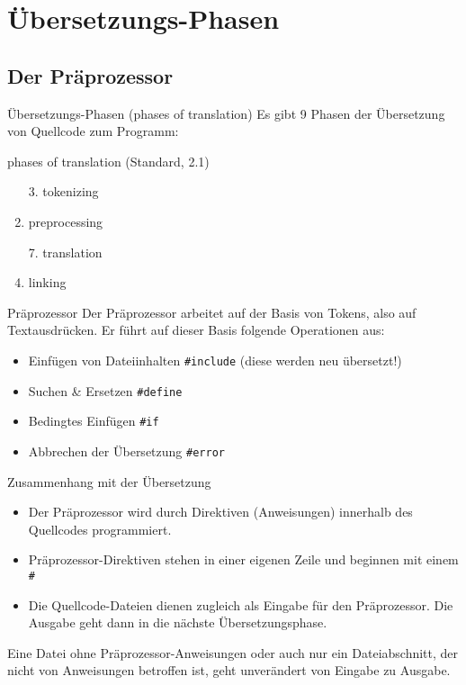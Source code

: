 \section{Übersetzungs-Phasen}


\subsection{Der Präprozessor}

\begin{frame}{Übersetzungs-Phasen (phases of translation)}
	Es gibt 9 Phasen der Übersetzung von Quellcode zum Programm:
	
	\vspace{2em}
	
	\begin{block}{phases of translation (Standard, 2.1)}
		\begin{enumerate}
			\item[3.] tokenizing
			\item<alert@2>[4.] preprocessing
			\item[7.] translation
			\item<alert@2>[9.] linking
		\end{enumerate}
	\end{block}
\end{frame}

\begin{frame}[fragile]{Präprozessor}
	Der Präprozessor arbeitet auf der Basis von Tokens, also auf Textausdrücken. Er führt auf dieser Basis folgende Operationen aus:
	
	\vspace{2em}
	
	\begin{itemize}
		\item Einfügen von Dateiinhalten \verb|#include| (diese werden neu übersetzt!)
		\item Suchen \& Ersetzen \verb|#define|
		\item Bedingtes Einfügen \verb|#if|
		\item Abbrechen der Übersetzung \verb|#error|
	\end{itemize}
\end{frame}

\begin{frame}[fragile]{Zusammenhang mit der Übersetzung}
	\begin{itemize}
		\item Der Präprozessor wird durch Direktiven (Anweisungen) innerhalb des Quellcodes programmiert.
		\item Präprozessor-Direktiven stehen in einer eigenen Zeile und beginnen mit einem \verb|#|
		\item Die Quellcode-Dateien dienen zugleich als Eingabe für den Präprozessor. Die Ausgabe geht dann in die nächste Übersetzungsphase.
	\end{itemize}
	
	\pause
	\vspace{1em}
	
	Eine Datei ohne Präprozessor-Anweisungen oder auch nur ein Dateiabschnitt, der nicht von Anweisungen betroffen ist, geht unverändert von Eingabe zu Ausgabe.
\end{frame}

